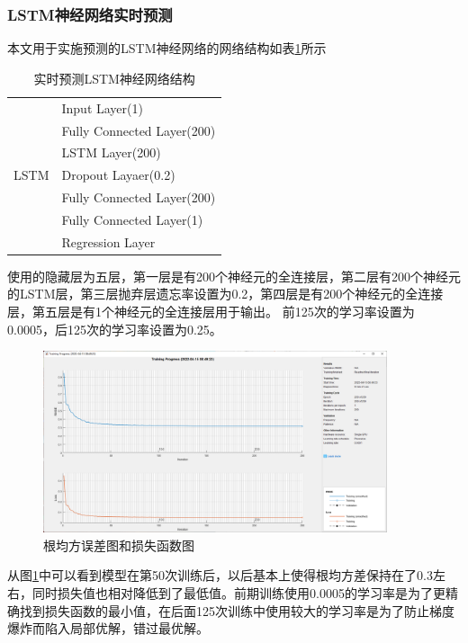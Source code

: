 \documentclass[UTF8]{ctexart}
\begin{document}
\subsubsection{LSTM神经网络实时预测}
本文用于实施预测的LSTM神经网络的网络结构如表\ref{NetStruct1}所示
    \begin{table}[H]
        \centering
        \begin{tabular}{|l|llll|}
            \hline
            \multirow{7}{*}{LSTM} & \multicolumn{4}{l|}{Input Layer(1)}    \\ \cline{2-5} 
                & \multicolumn{4}{l|}{Fully Connected Layer(200)} \\ \cline{2-5} 
                & \multicolumn{4}{l|}{LSTM Layer(200)}            \\ \cline{2-5} 
                & \multicolumn{4}{l|}{Dropout Layaer(0.2)}        \\ \cline{2-5} 
                & \multicolumn{4}{l|}{Fully Connected Layer(200)} \\ \cline{2-5} 
                & \multicolumn{4}{l|}{Fully Connected Layer(1)}   \\ \cline{2-5} 
                & \multicolumn{4}{l|}{Regression Layer}           \\ \hline
        \end{tabular}
        \caption{实时预测LSTM神经网络结构}
        \label{NetStruct1}
    \end{table}
使用的隐藏层为五层，第一层是有200个神经元的全连接层，第二层有200个神经元的LSTM层，第三层抛弃层遗忘率设置为0.2，第四层是有200个神经元的全连接层，第五层是有1个神经元的全连接层用于输出。
前125次的学习率设置为0.0005，后125次的学习率设置为0.25。

\begin{figure}[H] %
    \centering %
    \includegraphics[width=0.9\textwidth]{./picture/TrainingProgress1.png} %
    \caption{根均方误差图和损失函数图}
    \label{res1} 
\end{figure}
从图\ref{res1}中可以看到模型在第50次训练后，以后基本上使得根均方差保持在了0.3左右，同时损失值也相对降低到了最低值。前期训练使用0.0005的学习率是为了更精确找到损失函数的最小值，在后面125次训练中使用较大的学习率是为了防止梯度爆炸而陷入局部优解，错过最优解。
\end{document}
